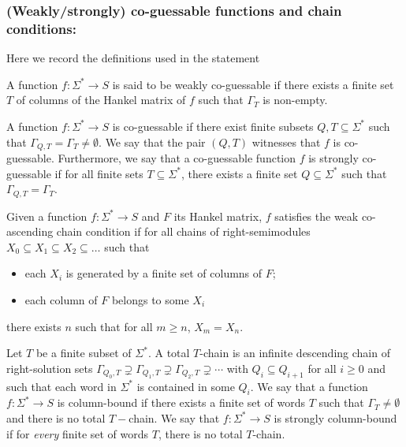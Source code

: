 \documentclass{lmcs}
\numberwithin{theorem}{section}
\begin{document}
\subsubsection*{\textbf{(Weakly/strongly) co-guessable functions and chain conditions:}}
Here we record the definitions used in the statement
\begin{defi}
A function $f: \Sigma^* \rightarrow S$ is said to be weakly co-guessable if there exists a finite set $T$ of columns of the Hankel matrix of $f$ such that $\Gamma_T$ is non-empty.	
\end{defi}

\begin{defi}
	A function $f: \Sigma^* \rightarrow S$ is co-guessable if there exist finite subsets $Q, T \subseteq \Sigma^*$ such that $\Gamma_{Q,T} = \Gamma_{T} \neq \emptyset$. We say that the pair $(Q,T)$ witnesses that $f$ is co-guessable. Furthermore, we say that a co-guessable function $f$ is strongly co-guessable if for all finite sets $T \subseteq \Sigma^*$, there exists a finite set $Q \subseteq \Sigma^*$ such that $\Gamma_{Q,T} = \Gamma_{T}$.
\end{defi}

\begin{defi}
Given a function $f:\Sigma^* \to S$ and $F$ its Hankel matrix, $f$ satisfies the weak co-ascending chain condition if for all chains of right-semimodules $X_0 \subseteq X_1 \subseteq X_2 \subseteq \ldots $ such that
\begin{itemize}
    \item each $X_i$ is generated by a finite set of columns of $F$;
    \item each column of $F$ belongs to some $X_i$
\end{itemize}
there exists $n$ such that for all $m \geq n$, $X_m = X_n$.
\end{defi}

\begin{defi}
Let $T$ be a finite subset of $\Sigma^*$.
A total $T$-chain is an infinite descending chain of right-solution sets $\Gamma_{Q_0, T} \supsetneq \Gamma_{Q_1, T} \supsetneq \Gamma_{Q_2, T} \supsetneq \cdots$  with $Q_i \subseteq Q_{i+1}$ for all $i \geq 0$ and such that each word in  $\Sigma^*$ is contained in some $Q_i$.
We say that a function $f: \Sigma^* \rightarrow S$ is column-bound if there exists a finite set of words $T$ such that 
$\Gamma_T \neq \emptyset$
 and there is no total $T-$chain.
We say that $f: \Sigma^* \rightarrow S$ is strongly column-bound if for \emph{every} finite set of words $T$, there is no total $T$-chain.
\end{defi}
\end{document}
